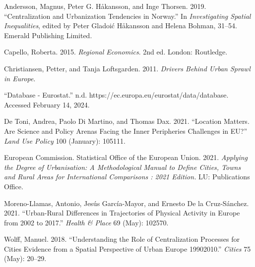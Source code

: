 \documentclass[
  letterpaper,
  DIV=11,
  numbers=noendperiod]{scrartcl}
\newlength{\cslhangindent}
\newlength{\cslentryspacingunit} %
\newenvironment{CSLReferences}[2] %
 {%
  \setlength{\parindent}{0pt}
  \ifodd #1
  \let\oldpar\par
  \def\par{\hangindent=\cslhangindent\oldpar}
  \fi
  \setlength{\parskip}{#2\cslentryspacingunit}
 }%
 {}
\begin{document}
\hypertarget{refs}{}
\begin{CSLReferences}{1}{0}
\leavevmode{}%
Andersson, Magnus, Peter G. Håkansson, and Inge Thorsen. 2019.
{``Centralization and {Urbanization Tendencies} in {Norway}.''} In
\emph{Investigating {Spatial Inequalities}}, edited by Peter Gladoić
Håkansson and Helena Bohman, 31--54. {Emerald Publishing Limited}.

\leavevmode{}%
Capello, Roberta. 2015. \emph{Regional {Economics}}. 2nd ed. {London}:
{Routledge}.

\leavevmode{}%
Christiansen, Petter, and Tanja Loftsgarden. 2011. \emph{Drivers Behind
Urban Sprawl in {Europe}}.

\leavevmode{}%
{``Database - {Eurostat}.''} n.d.
https://ec.europa.eu/eurostat/data/database. Accessed February 14, 2024.

\leavevmode{}%
De Toni, Andrea, Paolo Di Martino, and Thomas Dax. 2021. {``Location
Matters. {Are} Science and Policy Arenas Facing the {Inner Peripheries}
Challenges in {EU}?''} \emph{Land Use Policy} 100 (January): 105111.

\leavevmode{}%
European Commission. Statistical Office of the European Union. 2021.
\emph{Applying the Degree of Urbanisation: A Methodological Manual to
Define Cities, Towns and Rural Areas for International Comparisons :
2021 Edition.} {LU}: {Publications Office}.

\leavevmode{}%
Moreno-Llamas, Antonio, Jesús García-Mayor, and Ernesto De la
Cruz-Sánchez. 2021. {``Urban-Rural Differences in Trajectories of
Physical Activity in {Europe} from 2002 to 2017.''} \emph{Health \&
Place} 69 (May): 102570.

\leavevmode{}%
Wolff, Manuel. 2018. {``Understanding the Role of Centralization
Processes for Cities {\textendash} {Evidence} from a Spatial Perspective
of Urban {Europe} 1990{\textendash}2010.''} \emph{Cities} 75 (May):
20--29.

\end{CSLReferences}
\end{document}
